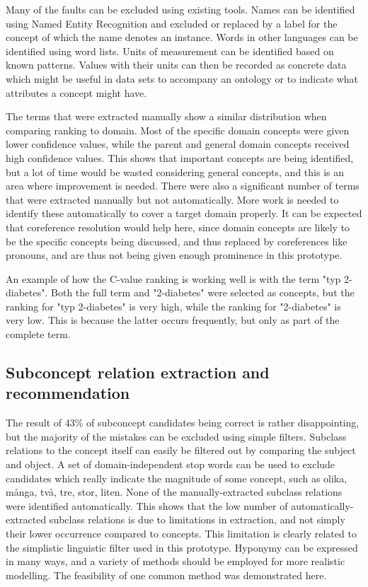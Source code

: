 \documentclass[a4paper]{report}
\begin{document}
Many of the faults can be excluded using existing tools.
Names can be identified using Named Entity Recognition and excluded or replaced by a label for the concept of which the name denotes an instance.
Words in other languages can be identified using word lists.
Units of measurement can be identified based on known patterns.
Values with their units can then be recorded as concrete data which might be useful in data sets to accompany an ontology or to indicate what attributes a concept might have.

The terms that were extracted manually show a similar distribution when comparing ranking to domain.
Most of the specific domain concepts were given lower confidence values, while the parent and general domain concepts received high confidence values.
This shows that important concepts are being identified, but a lot of time would be wasted considering general concepts, and this is an area where improvement is needed.
There were also a significant number of terms that were extracted manually but not automatically.
More work is needed to identify these automatically to cover a target domain properly.
It can be expected that coreference resolution would help here, since domain concepts are likely to be the specific concepts being discussed, and thus replaced by coreferences like pronouns, and are thus not being given enough prominence in this prototype.

An example of how the C-value ranking is working well is with the term "typ 2-diabetes". Both the full term and "2-diabetes" were selected as concepts, but the ranking for "typ 2-diabetes" is very high, while the ranking for "2-diabetes" is very low. This is because the latter occurs frequently, but only as part of the complete term.

\subsection{Subconcept relation extraction and recommendation}
\label{subsec:analysis:subconcepts}

The result of 43\% of subconcept candidates being correct is rather disappointing, but the majority of the mistakes can be excluded using simple filters.
Subclass relations to the concept itself can easily be filtered out by comparing the subject and object.
A set of domain-independent stop words can be used to exclude candidates which really indicate the magnitude of some concept, such as olika, många, två, tre, stor, liten.
None of the manually-extracted subclass relations were identified automatically.
This shows that the low number of automatically-extracted subclass relations is due to limitations in extraction, and not simply their lower occurrence compared to concepts.
This limitation is clearly related to the simplistic linguistic filter used in this prototype.
Hyponymy can be expressed in many ways, and a variety of methods should be employed for more realistic modelling.
The feasibility of one common method was demonstrated here.
\end{document}
